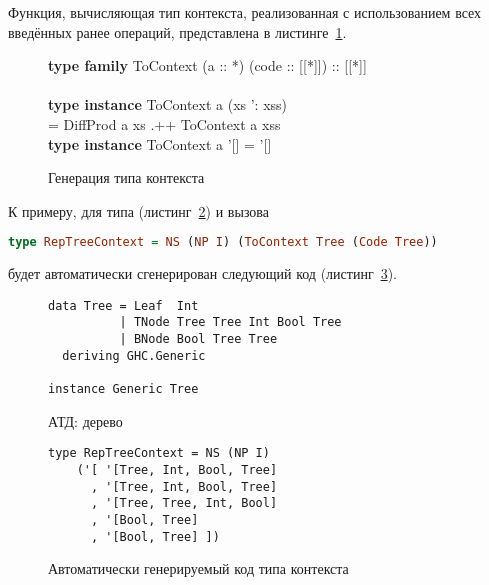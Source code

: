 Функция, вычисляющая тип контекста, реализованная с использованием всех введённых ранее операций, представлена в листинге~\ref{list:to-context}.\newpage
\begin{figure}[h]
\begin{framed}
\ttfamily\small
\textbf{type family} ToContext (a :: *) (code :: [[*]]) :: [[*]]\\
\\
\textbf{type instance} ToContext a (xs ': xss)\\
\ind = DiffProd a xs .++ ToContext a xss\\
\textbf{type instance} ToContext a '[] = '[]
\end{framed}
\caption{Генерация типа контекста}
\label{list:to-context}
\end{figure}

К примеру, для типа  (листинг~\ref{list:tree}) и вызова
\begin{lstlisting}[language=Haskell]
type RepTreeContext = NS (NP I) (ToContext Tree (Code Tree))
\end{lstlisting}
будет автоматически сгенерирован следующий код (листинг~\ref{list:rep-context}).
\begin{figure}[h]
\begin{framed}
\vspace{-0.25cm}
\begin{lstlisting}
data Tree = Leaf  Int
          | TNode Tree Tree Int Bool Tree
          | BNode Bool Tree Tree
  deriving GHC.Generic

instance Generic Tree
\end{lstlisting}
\vspace{-0.25cm}
\end{framed}
\caption{АТД: дерево}
\label{list:tree}
\end{figure}

\begin{figure}[h]
\begin{framed}
\vspace{-0.25cm}
\begin{lstlisting}
type RepTreeContext = NS (NP I)
    ('[ '[Tree, Int, Bool, Tree]
      , '[Tree, Int, Bool, Tree]
      , '[Tree, Tree, Int, Bool]
      , '[Bool, Tree]
      , '[Bool, Tree] ])
\end{lstlisting}
\vspace{-0.25cm}
\end{framed}
\caption{Автоматически генерируемый код типа контекста}
\label{list:rep-context}
\end{figure}

